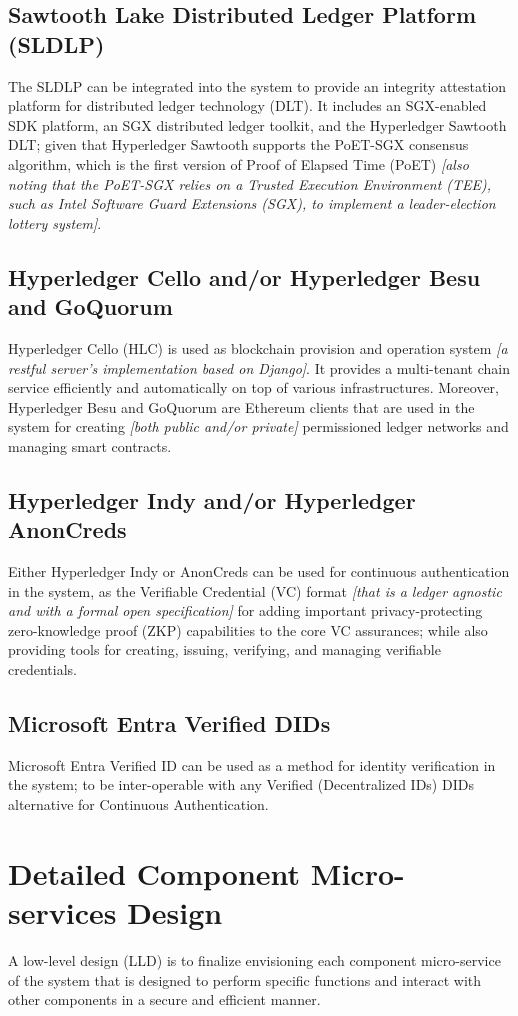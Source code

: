 \documentclass[11pt,a4paper]{article}
\begin{document}
\subsection{Sawtooth Lake Distributed Ledger Platform (SLDLP)} The SLDLP can be integrated into the system to provide an integrity attestation platform for distributed ledger technology (DLT). It includes an SGX-enabled SDK platform, an SGX distributed ledger toolkit, and the Hyperledger Sawtooth DLT; given that Hyperledger Sawtooth supports the PoET-SGX consensus algorithm, which is the first version of Proof of Elapsed Time (PoET) \textit{[also noting that the PoET-SGX relies on a Trusted Execution Environment (TEE), such as Intel Software Guard Extensions (SGX), to implement a leader-election lottery system]}.
\subsection{Hyperledger Cello and/or Hyperledger Besu and GoQuorum} Hyperledger Cello (HLC) is used as blockchain provision and operation system \textit{[a restful server’s implementation based on Django]}. It provides a multi-tenant chain service efficiently and automatically on top of various infrastructures. Moreover, Hyperledger Besu and GoQuorum are Ethereum clients that are used in the system for creating \textit{[both public and/or private]} permissioned ledger networks and managing smart contracts.
\subsection{Hyperledger Indy and/or Hyperledger AnonCreds} Either Hyperledger Indy or AnonCreds can be used for continuous authentication in the system, as the Verifiable Credential (VC) format \textit{[that is a ledger agnostic and with a formal open specification]} for adding important privacy-protecting zero-knowledge proof (ZKP) capabilities to the core VC assurances; while also providing tools for creating, issuing, verifying, and managing verifiable credentials.
\subsection{Microsoft Entra Verified DIDs} Microsoft Entra Verified ID can be used as a method for identity verification in the system; to be inter-operable with any Verified (Decentralized IDs) DIDs alternative for Continuous Authentication.

\section{Detailed Component Micro-services Design} A low-level design (LLD) is to finalize envisioning each component micro-service of the system that is designed to perform specific functions and interact with other components in a secure and efficient manner.
\end{document}

